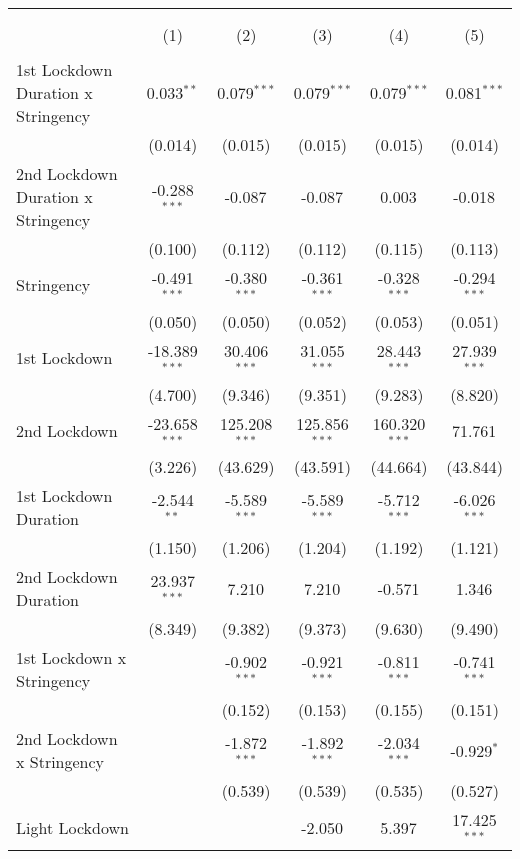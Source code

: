 \begin{tabular}{@{\extracolsep{5pt}}lccccc}
\\[-1.8ex]\hline
\hline \\[-1.8ex]
& \multicolumn{5}{c}{\textit{}} \
\cr \cline{5-6}
\\[-1.8ex] & (1) & (2) & (3) & (4) & (5) \\
\hline \\[-1.8ex]
 1st Lockdown Duration x Stringency & 0.033$^{**}$ & 0.079$^{***}$ & 0.079$^{***}$ & 0.079$^{***}$ & 0.081$^{***}$ \\
  & (0.014) & (0.015) & (0.015) & (0.015) & (0.014) \\
 2nd Lockdown Duration x Stringency & -0.288$^{***}$ & -0.087$^{}$ & -0.087$^{}$ & 0.003$^{}$ & -0.018$^{}$ \\
  & (0.100) & (0.112) & (0.112) & (0.115) & (0.113) \\
 Stringency & -0.491$^{***}$ & -0.380$^{***}$ & -0.361$^{***}$ & -0.328$^{***}$ & -0.294$^{***}$ \\
  & (0.050) & (0.050) & (0.052) & (0.053) & (0.051) \\
 1st Lockdown & -18.389$^{***}$ & 30.406$^{***}$ & 31.055$^{***}$ & 28.443$^{***}$ & 27.939$^{***}$ \\
  & (4.700) & (9.346) & (9.351) & (9.283) & (8.820) \\
 2nd Lockdown & -23.658$^{***}$ & 125.208$^{***}$ & 125.856$^{***}$ & 160.320$^{***}$ & 71.761$^{}$ \\
  & (3.226) & (43.629) & (43.591) & (44.664) & (43.844) \\
 1st Lockdown Duration & -2.544$^{**}$ & -5.589$^{***}$ & -5.589$^{***}$ & -5.712$^{***}$ & -6.026$^{***}$ \\
  & (1.150) & (1.206) & (1.204) & (1.192) & (1.121) \\
 2nd Lockdown Duration & 23.937$^{***}$ & 7.210$^{}$ & 7.210$^{}$ & -0.571$^{}$ & 1.346$^{}$ \\
  & (8.349) & (9.382) & (9.373) & (9.630) & (9.490) \\
 1st Lockdown x Stringency & & -0.902$^{***}$ & -0.921$^{***}$ & -0.811$^{***}$ & -0.741$^{***}$ \\
  & & (0.152) & (0.153) & (0.155) & (0.151) \\
 2nd Lockdown x Stringency & & -1.872$^{***}$ & -1.892$^{***}$ & -2.034$^{***}$ & -0.929$^{*}$ \\
  & & (0.539) & (0.539) & (0.535) & (0.527) \\
 Light Lockdown & & & -2.050$^{}$ & 5.397$^{}$ & 17.425$^{***}$ \\

\end{tabular}
